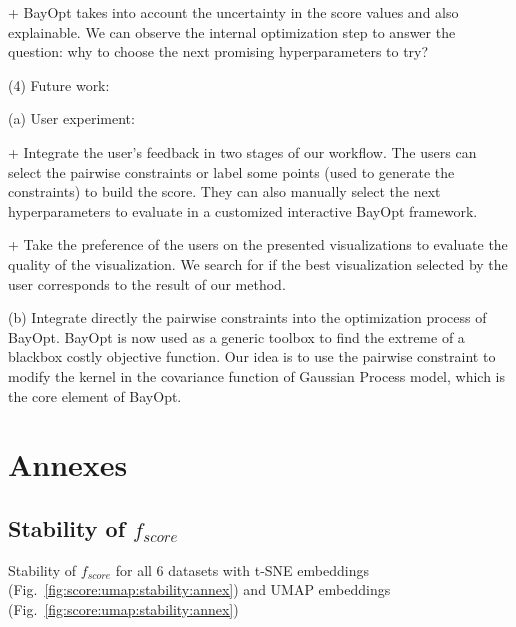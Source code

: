 + BayOpt takes into account the uncertainty in the score values and also explainable. We can observe the internal optimization step to answer the question: why to choose the next promising hyperparameters to try?


\vspace{8pt}
\par (4) Future work:

(a) User experiment:

+ Integrate the user's feedback in two stages of our workflow.
The users can select the pairwise constraints or label some points (used to generate the constraints) to build the score.
They can also manually select the next hyperparameters to evaluate in a customized interactive BayOpt framework.

+ Take the preference of the users on the presented visualizations to evaluate the quality of the visualization. We search for if the best visualization selected by the user corresponds to the result of our method.


(b) Integrate directly the pairwise constraints into the optimization process of BayOpt.
BayOpt is now used as a generic toolbox to find the extreme of a blackbox costly objective function.
Our idea is to use the pairwise constraint to modify the kernel in the covariance function of Gaussian Process model, which is the core element of BayOpt.


\section*{Annexes}

\subsection{Stability of $f_{score}$}

Stability of $f_{score}$ for all 6 datasets with t-SNE embeddings (Fig.~\ref{fig:score:umap:stability:annex}) and UMAP embeddings (Fig.~\ref{fig:score:umap:stability:annex})

